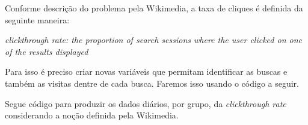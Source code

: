 \documentclass[]{article}
\newenvironment{Shaded}{\begin{snugshade}}{\end{snugshade}}
\newcommand{\KeywordTok}[1]{\textcolor[rgb]{0.13,0.29,0.53}{\textbf{#1}}}
\newcommand{\DataTypeTok}[1]{\textcolor[rgb]{0.13,0.29,0.53}{#1}}
\newcommand{\StringTok}[1]{\textcolor[rgb]{0.31,0.60,0.02}{#1}}
\newcommand{\CommentTok}[1]{\textcolor[rgb]{0.56,0.35,0.01}{\textit{#1}}}
\newcommand{\OperatorTok}[1]{\textcolor[rgb]{0.81,0.36,0.00}{\textbf{#1}}}
\newcommand{\NormalTok}[1]{#1}
\begin{document}
Conforme descrição do problema pela Wikimedia, a taxa de cliques é
definida da seguinte maneira:

\emph{clickthrough rate: the proportion of search sessions where the
user clicked on one of the results displayed}

Para isso é preciso criar novas variáveis que permitam identificar as
buscas e também as visitas dentre de cada busca. Faremos isso usando o
código a seguir.

\begin{Shaded}
\end{Shaded}

Segue código para produzir os dados diários, por grupo, da
\emph{clickthrough rate} considerando a noção definida pela Wikimedia.
\end{document}
